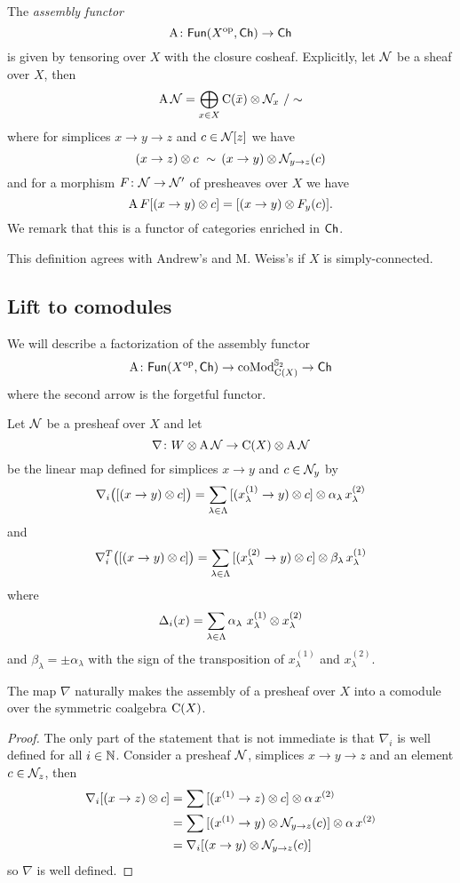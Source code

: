 The \textit{assembly functor}
\[
\operatorname{A} \colon \mathsf{Fun}(X^{\mathrm{op}}, \mathsf{Ch}) \to \mathsf{Ch}
\]
is given by tensoring over $X$ with the closure cosheaf.
Explicitly, let $\mathcal{N}$ be a sheaf over $X$, then
\[
\operatorname{A} \mathcal{N} = \bigoplus_{x \in X} \operatorname{C}(\bar x) \otimes \mathcal{N}_x \ / \sim
\]
where for simplices $x \to y \to z$ and $c \in \mathcal{N}[z]$ we have
\[
(x \to z) \otimes c \ \sim \, (x \to y) \otimes \mathcal{N}_{y \to z}(c)
\]
and for a morphism $F \colon \mathcal{N} \to \mathcal{N}'$ of presheaves over $X$ we have
\[
\operatorname{A} F[(x \to y) \otimes c] = [(x \to y) \otimes F_y(c)].
\]
We remark that this is a functor of categories enriched in $\mathsf{Ch}$.

This definition agrees with Andrew's and M. Weiss's \cite[Definition 1.4]{ranicki1990assembly} if $X$ is simply-connected.

\subsection{Lift to comodules}

We will describe a factorization of the assembly functor
\[
\operatorname{A} \colon \mathsf{Fun}(X^{\mathrm{op}}, \mathsf{Ch}) \to \operatorname{coMod}^{\mathbb{S}_2}_{\operatorname{C}(X)} \to \mathsf{Ch}
\]
where the second arrow is the forgetful functor.

Let $\mathcal{N}$ be a presheaf over $X$ and let
\[
\nabla \colon W \otimes \operatorname{A} \mathcal{N} \to \operatorname{C}(X) \otimes \operatorname{A} \mathcal{N}
\]
be the linear map defined for simplices $x \to y$ and $c \in \mathcal{N}_y$ by
\[
\nabla_i \big( [(x \to y) \otimes c] \big) =
\sum_{\lambda \in \Lambda} {[(x_\lambda^{(1)} \to y) \otimes c]} \otimes \alpha_\lambda \, x_\lambda^{(2)}
\]
and
\[
\nabla_i^T \big( [(x \to y) \otimes c] \big) =
\sum_{\lambda \in \Lambda} {[(x_\lambda^{(2)} \to y) \otimes c]} \otimes \beta_\lambda \, x_\lambda^{(1)}
\]
where
\[
\Delta_i(x) = \sum_{\lambda \in \Lambda} \alpha_\lambda \ x_\lambda^{(1)} \otimes x_\lambda^{(2)}
\]
and
$\beta_\lambda = \pm \alpha_\lambda$ with the sign of the transposition of $x_\lambda^{(1)}$ and $x_\lambda^{(2)}$.

\begin{lemma*}
	The map $\nabla$ naturally makes the assembly of a presheaf over $X$ into a comodule over the symmetric coalgebra $\operatorname{C}(X)$.
\end{lemma*}

\begin{proof}
	The only part of the statement that is not immediate is that $\nabla_i$ is well defined for all $i \in \mathbb{N}$.
	Consider a presheaf $\mathcal{N}$, simplices $x \to y \to z$ and an element $c \in \mathcal{N}_z$, then
	\begin{align*}
		\nabla_i [(x \to z) \otimes c] &=
		\sum {[(x^{(1)} \to z) \otimes c]} \otimes \alpha \, x^{(2)} \\ &=
		\sum {[(x^{(1)} \to y) \otimes\mathcal{N}_{y \to z}(c)]} \otimes \alpha \, x^{(2)} \\ &=
		\nabla_i [(x \to y) \otimes \mathcal{N}_{y \to z}(c)]
	\end{align*}
	so $\nabla$ is well defined.
\end{proof}

